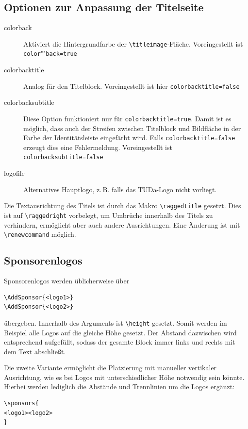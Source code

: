 \documentclass[
	ngerman,%
	accentcolor=9c,%
]{tudaleaflet}
\begin{document}
\subsection{Optionen zur Anpassung der Titelseite}
\begin{description}
	\item[colorback] Aktiviert die Hintergrundfarbe der \verb+\titleimage+-Fläche. Voreingestellt ist \verb+color+""\verb+back=true+
	\item[colorbacktitle] Analog für den Titelblock. Voreingestellt ist hier \verb+colorbacktitle=false+
	\item[colorbacksubtitle] Diese Option funktioniert nur für \verb+colorbacktitle=true+. Damit ist es möglich, dass auch der Streifen zwischen Titelblock und Bildfläche in der Farbe der Identitätsleiste eingefärbt wird. Falls \verb+colorbacktitle=false+ erzeugt dies eine Fehlermeldung. Voreingestellt ist \verb+colorbacksubtitle=false+
	\item[logofile] Alternatives Hauptlogo, z.\,B. falls das TUDa-Logo nicht vorliegt.
\end{description}

Die Textausrichtung des Titels ist durch das Makro \verb+\raggedtitle+ gesetzt. Dies ist auf \verb+\raggedright+ vorbelegt, um Umbrüche innerhalb des Titels zu verhindern, ermöglicht aber auch andere Ausrichtungen. Eine Änderung ist mit \verb+\renewcommand+ möglich.

\subsection{Sponsorenlogos}
Sponsorenlogos werden üblicherweise über
\begin{verbatim}
\AddSponsor{<logo1>}
\AddSponsor{<logo2>}
\end{verbatim}
übergeben. Innerhalb des Arguments ist \verb+\height+ gesetzt. Somit werden im Beispiel alle Logos auf die gleiche Höhe gesetzt. Der Abstand dazwischen wird entsprechend aufgefüllt, sodass der gesamte Block immer links und rechts mit dem Text abschließt.

Die zweite Variante ermöglicht die Platzierung mit manueller vertikaler Ausrichtung, wie es bei Logos mit unterschiedlicher Höhe notwendig sein könnte. Hierbei werden lediglich die Abstände und Trennlinien um die Logos ergänzt:

\begin{verbatim}
\sponsors{
<logo1><logo2>
}
\end{verbatim}
\end{document}

